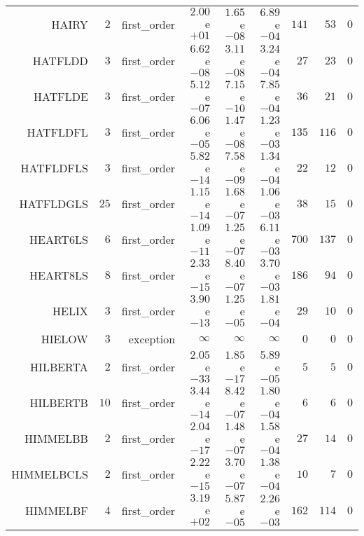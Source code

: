 \begin{longtable}{rrrrrrrrr}
HAIRY & \(     2\) & first\_order & \( 2.00\)e\(+01\) & \( 1.65\)e\(-08\) & \( 6.89\)e\(-04\) & \(   141\) & \(    53\) & \(     0\) \\
HATFLDD & \(     3\) & first\_order & \( 6.62\)e\(-08\) & \( 3.11\)e\(-08\) & \( 3.24\)e\(-04\) & \(    27\) & \(    23\) & \(     0\) \\
HATFLDE & \(     3\) & first\_order & \( 5.12\)e\(-07\) & \( 7.15\)e\(-10\) & \( 7.85\)e\(-04\) & \(    36\) & \(    21\) & \(     0\) \\
HATFLDFL & \(     3\) & first\_order & \( 6.06\)e\(-05\) & \( 1.47\)e\(-08\) & \( 1.23\)e\(-03\) & \(   135\) & \(   116\) & \(     0\) \\
HATFLDFLS & \(     3\) & first\_order & \( 5.82\)e\(-14\) & \( 7.58\)e\(-09\) & \( 1.34\)e\(-04\) & \(    22\) & \(    12\) & \(     0\) \\
HATFLDGLS & \(    25\) & first\_order & \( 1.15\)e\(-14\) & \( 1.68\)e\(-07\) & \( 1.06\)e\(-03\) & \(    38\) & \(    15\) & \(     0\) \\
HEART6LS & \(     6\) & first\_order & \( 1.09\)e\(-11\) & \( 1.25\)e\(-07\) & \( 6.11\)e\(-03\) & \(   700\) & \(   137\) & \(     0\) \\
HEART8LS & \(     8\) & first\_order & \( 2.33\)e\(-15\) & \( 8.40\)e\(-07\) & \( 3.70\)e\(-03\) & \(   186\) & \(    94\) & \(     0\) \\
HELIX & \(     3\) & first\_order & \( 3.90\)e\(-13\) & \( 1.25\)e\(-05\) & \( 1.81\)e\(-04\) & \(    29\) & \(    10\) & \(     0\) \\
HIELOW & \(     3\) & exception & \(\infty\) & \(\infty\) & \(\infty\) & \(     0\) & \(     0\) & \(     0\) \\
HILBERTA & \(     2\) & first\_order & \( 2.05\)e\(-33\) & \( 1.85\)e\(-17\) & \( 5.89\)e\(-05\) & \(     5\) & \(     5\) & \(     0\) \\
HILBERTB & \(    10\) & first\_order & \( 3.44\)e\(-14\) & \( 8.42\)e\(-07\) & \( 1.80\)e\(-04\) & \(     6\) & \(     6\) & \(     0\) \\
HIMMELBB & \(     2\) & first\_order & \( 2.04\)e\(-17\) & \( 1.48\)e\(-07\) & \( 1.58\)e\(-04\) & \(    27\) & \(    14\) & \(     0\) \\
HIMMELBCLS & \(     2\) & first\_order & \( 2.22\)e\(-15\) & \( 3.70\)e\(-07\) & \( 1.38\)e\(-04\) & \(    10\) & \(     7\) & \(     0\) \\
HIMMELBF & \(     4\) & first\_order & \( 3.19\)e\(+02\) & \( 5.87\)e\(-05\) & \( 2.26\)e\(-03\) & \(   162\) & \(   114\) & \(     0\) \\

\end{longtable}
